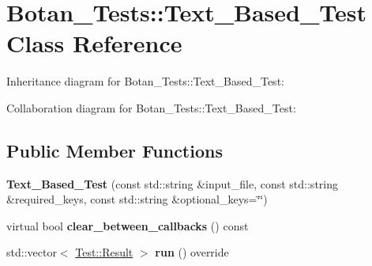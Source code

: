 \hypertarget{class_botan___tests_1_1_text___based___test}{}\section{Botan\+\_\+\+Tests\+:\+:Text\+\_\+\+Based\+\_\+\+Test Class Reference}
\label{class_botan___tests_1_1_text___based___test}


Inheritance diagram for Botan\+\_\+\+Tests\+:\+:Text\+\_\+\+Based\+\_\+\+Test\+:


Collaboration diagram for Botan\+\_\+\+Tests\+:\+:Text\+\_\+\+Based\+\_\+\+Test\+:
\subsection*{Public Member Functions}
\begin{DoxyCompactItemize}
\item 
\mbox{\label{class_botan___tests_1_1_text___based___test_a359827a1eda6799e41117625e531d019}} 
{\bfseries Text\+\_\+\+Based\+\_\+\+Test} (const std\+::string \&input\+\_\+file, const std\+::string \&required\+\_\+keys, const std\+::string \&optional\+\_\+keys=\char`\"{}\char`\"{})
\item 
\mbox{\label{class_botan___tests_1_1_text___based___test_a68f0ffdac7d572890d63d7f9603bb608}} 
virtual bool {\bfseries clear\+\_\+between\+\_\+callbacks} () const
\item 
\mbox{\label{class_botan___tests_1_1_text___based___test_a34b65d8a30ac066994cd40cf689ce85e}} 
std\+::vector$<$ \mbox{\hyperlink{class_botan___tests_1_1_test_1_1_result}{Test\+::\+Result}} $>$ {\bfseries run} () override
\end{DoxyCompactItemize}
